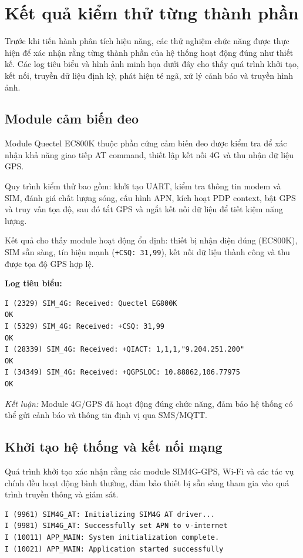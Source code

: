 
\section{Kết quả kiểm thử từng thành phần}
\label{sec:component_testing}

Trước khi tiến hành phân tích hiệu năng, các thử nghiệm chức năng được thực hiện để xác nhận rằng từng thành phần của hệ thống hoạt động đúng như thiết kế.  
Các log tiêu biểu và hình ảnh minh họa dưới đây cho thấy quá trình khởi tạo, kết nối, truyền dữ liệu định kỳ, phát hiện té ngã, xử lý cảnh báo và truyền hình ảnh.

\subsection{Module cảm biến đeo}
Module Quectel EC800K thuộc phần cứng cảm biến đeo được kiểm tra để xác nhận khả năng giao tiếp AT command, thiết lập kết nối 4G và thu nhận dữ liệu GPS.  

Quy trình kiểm thử bao gồm: khởi tạo UART, kiểm tra thông tin modem và SIM, đánh giá chất lượng sóng, cấu hình APN, kích hoạt PDP context, bật GPS và truy vấn tọa độ, sau đó tắt GPS và ngắt kết nối dữ liệu để tiết kiệm năng lượng.  

Kết quả cho thấy module hoạt động ổn định: thiết bị nhận diện đúng (EC800K), SIM sẵn sàng, tín hiệu mạnh (\texttt{+CSQ: 31,99}), kết nối dữ liệu thành công và thu được tọa độ GPS hợp lệ.

\textbf{Log tiêu biểu:}
\begin{verbatim}
I (2329) SIM_4G: Received: Quectel EG800K
OK
I (5329) SIM_4G: Received: +CSQ: 31,99
OK
I (28339) SIM_4G: Received: +QIACT: 1,1,1,"9.204.251.200"
OK
I (34349) SIM_4G: Received: +QGPSLOC: 10.88862,106.77975
OK
\end{verbatim}

\textit{Kết luận:} Module 4G/GPS đã hoạt động đúng chức năng, đảm bảo hệ thống có thể gửi cảnh báo và thông tin định vị qua SMS/MQTT.

\subsection{Khởi tạo hệ thống và kết nối mạng}
Quá trình khởi tạo xác nhận rằng các module SIM4G-GPS, Wi-Fi và các tác vụ chính đều hoạt động bình thường, đảm bảo thiết bị sẵn sàng tham gia vào quá trình truyền thông và giám sát.

\begin{verbatim}
I (9961) SIM4G_AT: Initializing SIM4G AT driver...
I (9981) SIM4G_AT: Successfully set APN to v-internet
I (10011) APP_MAIN: System initialization complete.
I (10021) APP_MAIN: Application started successfully
\end{verbatim}

